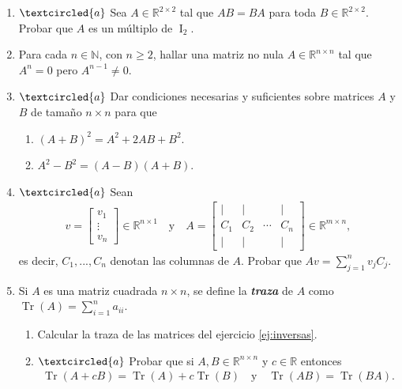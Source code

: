 \begin{enumerate}[topsep=6pt,itemsep=.4cm]
\item\label{2x2 central} $\textcircled{a}$ Sea $A \in\mathbb{R}^{2\times 2}$ tal que $AB=BA$ para toda $B\in\mathbb{R}^{2\times 2}$. Probar que $A$ es un m\'ultiplo de $\operatorname{I}_2$.


\item  Para cada $n\in\mathbb{N}$, con $n\geq 2$, hallar una matriz no nula $A\in\mathbb{R}^{n\times n}$ tal que $A^n=0$ pero $A^{n-1}\neq0$.


\item\label{eq:binomio} $\textcircled{a}$ Dar condiciones necesarias y suficientes sobre matrices $A$ y $B$ de tama\~{n}o $n\times n$ para que
\begin{multicols}{2}
    \begin{enumerate}
        \item $(A + B)^2 = A^2 + 2AB + B^2$.
        \item $A^2 - B^2 = (A - B)(A + B)$.
    \end{enumerate}
\end{multicols}


\item\label{ej:multiplicar por columna} $\textcircled{a}$ Sean
\begin{align*}
v=\begin{bmatrix} v_1 \\ \vdots \\ v_n
\end{bmatrix}\in\mathbb{R}^{n\times1}
\quad\mbox{y}\quad A=\begin{bmatrix} \mid& \mid& &\mid\\ C_1 & C_2 & \cdots &C_n\\ \mid& \mid& &\mid\end{bmatrix}
\in\mathbb{R}^{m\times n},
\end{align*}
es decir, $C_1, ..., C_n$ denotan las columnas de $A$. Probar que $Av=\sum_{j=1}^nv_jC_j$.


\item\label{traza} Si $A$ es una matriz cuadrada $n\times n$, se define la {\it \textbf{traza}} de $A$
como $\operatorname{Tr}(A)=\displaystyle{\sum_{i=1}^n} a_{ii}$.
\begin{enumerate}[topsep=5pt,itemsep=5pt]
 \item Calcular la traza de las matrices del ejercicio  \ref{ej:inversas}.
 \item\label{ej:traza}$\textcircled{a}$ Probar que si $A,B\in\mathbb{R}^{n\times n}$ y $c\in\mathbb{R}$ entonces
 \begin{align*}
 \operatorname{Tr}(A+cB)=\operatorname{Tr}(A)+c\operatorname{Tr}(B)
 \quad\mbox{y}\quad
 \operatorname{Tr}(AB)=\operatorname{Tr}(BA).
 \end{align*}
\end{enumerate}


\end{enumerate}
